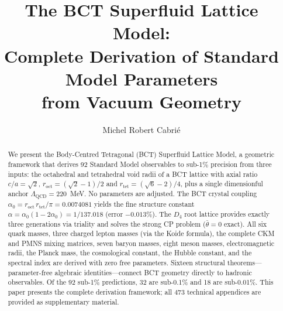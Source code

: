 \documentclass[review,number,sort&compress]{elsarticle}
\newcommand{\roct}{r_{\mathrm{oct}}}
\newcommand{\rtet}{r_{\mathrm{tet}}}
\newcommand{\azero}{\alpha_0}
\newcommand{\LQCD}{\Lambda_{\mathrm{QCD}}}
\newcommand{\thetabar}{\bar{\theta}}
\newcommand{\Dfour}{D_4}
\begin{document}
\begin{frontmatter}

\title{The BCT Superfluid Lattice Model:\\
Complete Derivation of Standard Model Parameters\\
from Vacuum Geometry}

\author[ind]{Michel Robert Cabri\'{e}}
\address[ind]{Independent Researcher}

\begin{abstract}
We present the Body-Centred Tetragonal (BCT) Superfluid Lattice Model,
a geometric framework that derives 92 Standard Model observables to
sub-1\% precision from three inputs: the octahedral and tetrahedral void
radii of a BCT lattice with axial ratio $c/a = \sqrt{2}$,
$\roct = (\sqrt{2}-1)/2$ and $\rtet = (\sqrt{6}-2)/4$, plus a single
dimensionful anchor $\LQCD = 220$~MeV. No parameters are adjusted.
The BCT crystal coupling $\azero = \roct\,\rtet/\pi = 0.0074081$
yields the fine structure constant $\alpha = \azero(1-2\azero) = 1/137.018$
(error $-0.013\%$). The $\Dfour$ root lattice provides exactly three
generations via triality and solves the strong CP problem
($\thetabar = 0$ exact). All six quark masses, three charged lepton
masses (via the Koide formula), the complete CKM and PMNS mixing matrices,
seven baryon masses, eight meson masses, electromagnetic radii, the
Planck mass, the cosmological constant, the Hubble constant, and the
spectral index are derived with zero free parameters. Sixteen structural
theorems---parameter-free algebraic identities---connect BCT geometry
directly to hadronic observables. Of the 92 sub-1\% predictions,
32 are sub-0.1\% and 18 are sub-0.01\%. This paper presents the complete
derivation framework; all 473 technical appendices are provided as
supplementary material.
\end{abstract}


\end{frontmatter}

\tableofcontents
\newpage

\end{document}
